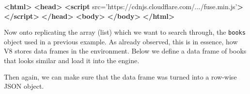 \documentclass[10pt,]{krantz}
\makeatletter
\newenvironment{Shaded}{\begin{snugshade}}{\end{snugshade}}
\newcommand{\CommentTok}[1]{\textcolor[rgb]{0.37,0.37,0.37}{\textit{#1}}}
\newcommand{\DataTypeTok}[1]{\textcolor[rgb]{0.27,0.27,0.27}{#1}}
\newcommand{\KeywordTok}[1]{\textcolor[rgb]{0.27,0.27,0.27}{\textbf{#1}}}
\newcommand{\NormalTok}[1]{#1}
\newcommand{\OperatorTok}[1]{\textcolor[rgb]{0.43,0.43,0.43}{\textbf{#1}}}
\newcommand{\OtherTok}[1]{\textcolor[rgb]{0.37,0.37,0.37}{#1}}
\newcommand{\StringTok}[1]{\textcolor[rgb]{0.5,0.5,0.5}{#1}}
\newenvironment{kframe}{%
\medskip{}
\setlength{\fboxsep}{.8em}
 \def\at@end@of@kframe{}%
 \ifinner\ifhmode%
  \def\at@end@of@kframe{\end{minipage}}%
  \begin{minipage}{\columnwidth}%
 \fi\fi%
 \def\FrameCommand##1{\hskip\@totalleftmargin \hskip-\fboxsep
 \colorbox{shadecolor}{##1}\hskip-\fboxsep
     \hskip-\linewidth \hskip-\@totalleftmargin \hskip\columnwidth}%
 \MakeFramed {\advance\hsize-\width
   \@totalleftmargin\z@ \linewidth\hsize
   \@setminipage}}%
 {\par\unskip\endMakeFramed%
 \at@end@of@kframe}
\renewenvironment{Shaded}{\begin{kframe}}{\end{kframe}}
\makeatother
\begin{document}
\begin{Shaded}
\begin{Highlighting}[]
\KeywordTok{<html>}
  \KeywordTok{<head>}
    \KeywordTok{<script} 
\OtherTok{      src=}\StringTok{'https://cdnjs.cloudflare.com/.../fuse.min.js'}\KeywordTok{>}
    \KeywordTok{</script>}
  \KeywordTok{</head>}
  \KeywordTok{<body>}
  \KeywordTok{</body>}
\KeywordTok{</html>}
\end{Highlighting}
\end{Shaded}

Now onto replicating the array (list) which we want to search through, the \texttt{books} object used in a previous example. As already observed, this is in essence, how V8 stores data frames in the environment. Below we define a data frame of books that looks similar and load it into the engine.

\begin{Shaded}
\end{Shaded}

Then again, we can make sure that the data frame was turned into a row-wise JSON object.

\begin{Shaded}
\end{Shaded}
\end{document}
